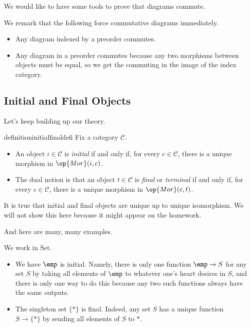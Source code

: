 \documentclass[../notes.tex]{subfiles}
\begin{document}
We would like to have some tools to prove that diagrams commute.
\begin{remark}
	We remark that the following force commutative diagrams immediately.
	\begin{itemize}
		\item Any diagram indexed by a preorder commutes.
		\item Any diagram in a preorder commutes because any two morphisms between objects must be equal, so we get the commuting in the image of the index category.
	\end{itemize}
\end{remark}

\subsection{Initial and Final Objects}
Let's keep building up our theory.
\begin{restatable}{definition}{initialfinaldefi}
	Fix a category $\mathcal C$.
	\begin{itemize}
		\item An object $i\in\mathcal C$ is \textit{initial} if and only if, for every $c\in\mathcal C$, there is a unique morphism in $\op{Mor}(i,c)$.
		\item The dual notion is that an object $t\in\mathcal C$ is \textit{final} or \textit{terminal} if and only if, for every $c\in\mathcal C$, there is a unique morphism in $\op{Mor}(c,t)$.
	\end{itemize}
\end{restatable}
\begin{remark}
	It is true that initial and final objects are unique up to unique isomorphism. We will not show this here because it might appear on the homework.
\end{remark}
And here are many, many examples.
\begin{example}
	We work in $\mathrm{Set}$.
	\begin{itemize}
		\item We have $\emp$ is initial. Namely, there is only one function $\emp\to S$ for any set $S$ by taking all elements of $\emp$ to whatever one's heart desires in $S$, and there is only one way to do this because any two such functions always have the same outputs.
		\item The singleton set $\{*\}$ is final. Indeed, any set $S$ has a unique function $S\to\{*\}$ by sending all elements of $S$ to $*$.
	\end{itemize}
\end{example}
\end{document}
